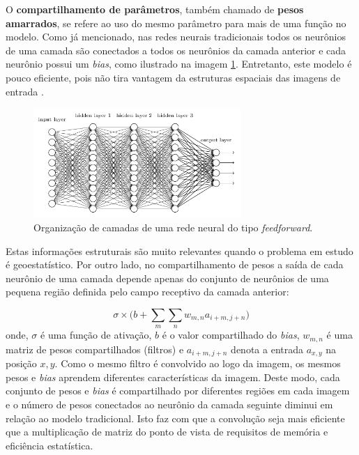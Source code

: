 O \textbf{compartilhamento de parâmetros}, também chamado de \textbf{pesos amarrados},
se refere ao uso do mesmo parâmetro para mais de uma função no modelo.
Como já mencionado, nas redes neurais tradicionais todos os neurônios de uma camada são conectados a todos os neurônios
da camada anterior e cada neurônio possui um \textit{bias}, como ilustrado na imagem \ref{fig:shallow}.
Entretanto, este modelo é pouco eficiente, pois não tira vantagem da estruturas espaciais das imagens
de entrada \cite{Gdfl16}.
\begin{figure}[htp]
\begin{center}
  \includegraphics[width=0.7\textwidth]{fig/shallow_nn}
  \caption{Organização de camadas de uma rede neural do tipo \textit{feedforward}.}
  \label{fig:shallow}
\end{center}
\end{figure}
Estas informações estruturais são muito relevantes quando o problema em estudo é geoestatístico.
Por outro lado, no compartilhamento de pesos a saída de cada neurônio de uma camada depende apenas do conjunto de neurônios
de uma pequena região definida pelo campo receptivo da camada anterior:

\begin{equation}
 {\sigma} \times \bigg( b + \sum_{m}\sum_{n}{w_{m,n}a_{i+m,j+n} \bigg) }
\end{equation}
onde, $\sigma$ é uma função de ativação, $b$ é o valor compartilhado do \textit{bias}, $w_{m,n}$ é
uma matriz de pesos compartilhados (filtros) e $a_{i+m,j+n}$ denota a entrada $a_{x,y}$ na posição
$x,y$. Como o mesmo filtro é convolvido ao logo da imagem,
os mesmos pesos e \textit{bias} aprendem diferentes características da imagem. Deste modo, cada conjunto de pesos e \textit{bias} é compartilhado
por diferentes regiões em cada imagem e o número de pesos conectados ao neurônio
da camada seguinte diminui em relação ao modelo tradicional. Isto faz com que a convolução seja mais eficiente que a multiplicação de matriz
do ponto de vista de requisitos de memória e eficiência estatística.

